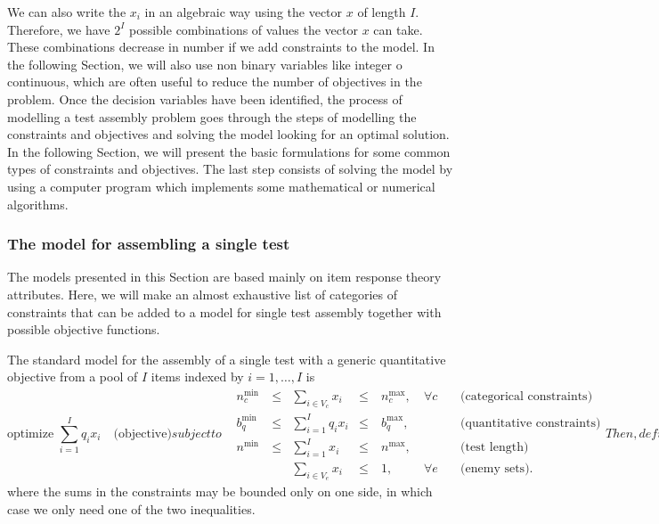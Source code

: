 We can also write the $x_i$ in an algebraic way using the vector $x$ of length $I$. 
Therefore, we have $2^I$ possible combinations of values the vector $x$ can take.
These combinations decrease in number if we add constraints to the model.
In the following Section, we will also use non binary variables like integer o continuous, which are often useful to reduce the number of objectives in the problem.
Once the decision variables have been identified, the process of modelling a test assembly problem goes through the steps of modelling the constraints and objectives and solving the model looking for an optimal solution.
In the following Section, we will present the basic formulations for some common types of constraints and objectives. The last step consists of solving the model by using a computer program which implements some mathematical or numerical algorithms.

\subsubsection{The model for assembling a single test}

The models presented in this Section are based mainly on item response theory attributes. 
Here, we will make an almost exhaustive list of categories of constraints that can be added to a model for single test assembly together with possible objective functions.

The standard model for the assembly of a single test with a generic quantitative objective from a pool of $I$ items indexed by $i=1,\ldots,I$ is
\begin{subequations}\label{eq:singClassTest}
	
	\begin{equation}\label{eq:Sobj}
	\mbox{optimize } {\sum_{i=1}^I q_i x_{i}} \quad \mbox{(objective)}
	\end{equation}
	subject to    
	\begin{alignat}{4}
	\label{eq:Scat}
	&n^{\min}_{c} \ &\le & \sum_{i \in V_c} x_i &\le \ & n^{\max}_{c}, \ & \forall c \quad & \mbox{(categorical constraints)}\\
	\label{eq:Squan}
	&b^{\min}_{q} \ &\le & \sum_{i=1}^I q_i x_i &\le \ & b^{\max}_{q}, \ &              \quad & \mbox{(quantitative constraints)}\\
	\label{eq:Slen}
	&n^{\min}      \ &\leq & \sum_{i=1}^I x_i &\le \ & n^{\max},      \ &             \quad & \mbox{(test length)}\\
	\label{eq:Sene}
	&    \ & & \sum_{i \in V_e} x_i&\le \ & 1,              \ & \forall e \quad & \mbox{(enemy sets)}.
	\end{alignat}
	
	Then, definition of variables
	\begin{equation*}\label{eq:SDV2}
	x_i \in \{0,1\}, \ \forall i \quad \mbox{(decision variables)}.
	\end{equation*}
	\label{eq:Smod}
\end{subequations}
where the sums in the constraints may be bounded only on one side, in which case we only need one of the two inequalities.

